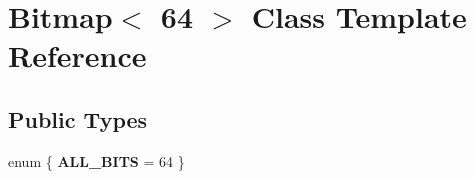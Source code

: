 \hypertarget{classBitmap_3_0164_01_4}{}\section{Bitmap$<$ 64 $>$ Class Template Reference}
\label{classBitmap_3_0164_01_4}
\subsection*{Public Types}
\begin{DoxyCompactItemize}
\item 
\mbox{\label{classBitmap_3_0164_01_4_a99f8ebe2f16947155e999d8d7d8c9083}} 
enum \{ {\bfseries A\+L\+L\+\_\+\+B\+I\+TS} = 64
 \}
\end{DoxyCompactItemize}
